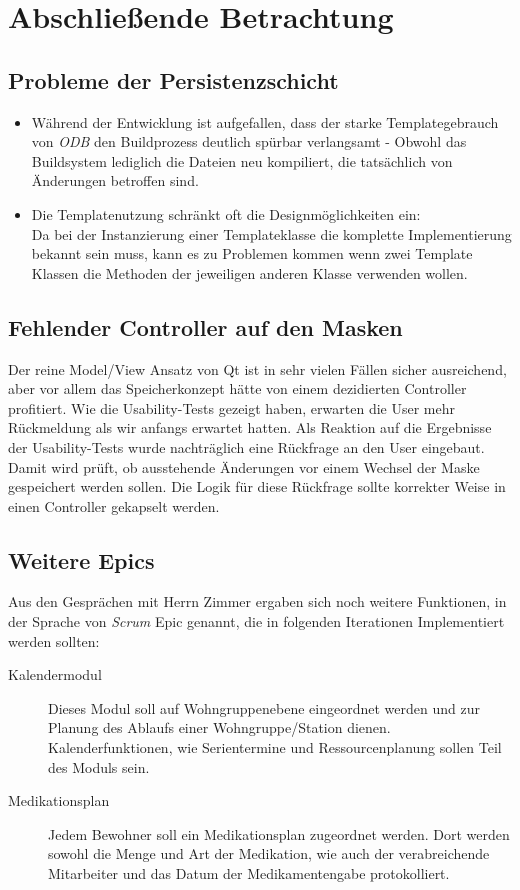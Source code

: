 \section{Abschließende Betrachtung}
\label{sec:abschluss}

\subsection{Probleme der Persistenzschicht}
\begin{itemize}
	\item Während der Entwicklung ist aufgefallen, dass der starke Templategebrauch von \textit{ODB} den Buildprozess deutlich spürbar verlangsamt - Obwohl das Buildsystem lediglich die Dateien neu kompiliert, die tatsächlich von Änderungen betroffen sind.\\
	\item Die Templatenutzung schränkt oft die Designmöglichkeiten ein:\\
		Da bei der Instanzierung einer Templateklasse die komplette Implementierung bekannt sein muss,
		kann es zu Problemen kommen wenn zwei Template Klassen die Methoden der jeweiligen anderen Klasse verwenden wollen.
\end{itemize}
\subsection{Fehlender Controller auf den Masken}
Der reine Model/View Ansatz von Qt ist in sehr vielen Fällen sicher ausreichend, aber vor allem das Speicherkonzept hätte von einem dezidierten
Controller profitiert. Wie die Usability-Tests gezeigt haben, erwarten die User mehr Rückmeldung als wir anfangs erwartet hatten. Als Reaktion auf
die Ergebnisse der Usability-Tests wurde nachträglich eine Rückfrage an den User eingebaut. Damit wird prüft, ob ausstehende Änderungen vor
einem Wechsel der Maske gespeichert werden sollen. Die Logik für diese Rückfrage sollte korrekter Weise in einen Controller gekapselt werden. 

\subsection{Weitere Epics}
Aus den Gesprächen mit Herrn Zimmer ergaben sich noch weitere Funktionen, in der Sprache von \textit{Scrum} Epic genannt, die in folgenden
Iterationen Implementiert werden sollten:
\begin{description}
 \item[Kalendermodul] Dieses Modul soll auf Wohngruppenebene eingeordnet werden und zur Planung des Ablaufs einer Wohngruppe/Station dienen.
Kalenderfunktionen, wie Serientermine und Ressourcenplanung sollen Teil des Moduls sein.
 \item[Medikationsplan] Jedem Bewohner soll ein Medikationsplan zugeordnet werden. Dort werden sowohl die Menge und Art der Medikation, wie auch der
verabreichende Mitarbeiter und das Datum der Medikamentengabe protokolliert.
\end{description}

 
